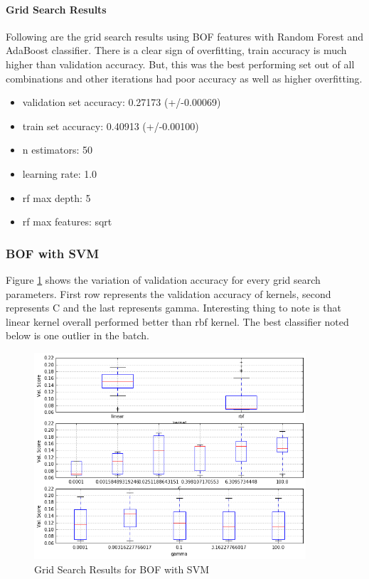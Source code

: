 \documentclass[12pt]{article}
\begin{document}
\paragraph{Grid Search Results}
Following are the grid search results using BOF features with Random Forest and AdaBoost classifier.  There is a clear sign of overfitting, train accuracy is much higher than validation accuracy. But, this was the best performing set out of all combinations and other iterations had poor accuracy as well as higher overfitting.
\begin{itemize}
\item validation set accuracy: 0.27173 (+/-0.00069) 
\item train set accuracy: 0.40913 (+/-0.00100)
\item n estimators: 50
\item learning rate: 1.0
\item rf max depth: 5
\item rf max features: sqrt
\end{itemize}


\subsubsection{BOF with SVM}
Figure \ref{img:svm_cv_bow} shows the variation of validation accuracy for every grid search parameters. First row represents the validation accuracy of kernels, second represents C and the last represents gamma. Interesting thing to note is that linear kernel overall performed better than rbf kernel. The best classifier noted below is one outlier in the batch.
\begin{figure}[H]
\centering
\includegraphics[width=0.9\textwidth]{images/svm_cv_bow.png} 
\caption{Grid Search Results for BOF with SVM}
\label{img:svm_cv_bow}
\end{figure}
\end{document}
